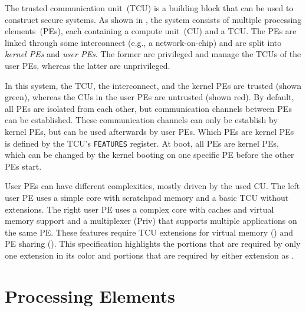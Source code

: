 \noindent The trusted communication unit~(TCU) is a building block that can be used to construct
secure systems. As shown in , the system consists of multiple processing
elements~(PEs), each containing a compute unit~(CU) and a TCU. The PEs are linked through some
interconnect (e.g., a network-on-chip) and are split into \emph{kernel PEs} and \emph{user PEs}. The
former are privileged and manage the TCUs of the user PEs, whereas the latter are unprivileged.

In this system, the TCU, the interconnect, and the kernel PEs are trusted (shown green), whereas the
CUs in the user PEs are untrusted (shown red). By default, all PEs are isolated from each other, but
communication channels between PEs can be established. These communication channels can only be
establish by kernel PEs, but can be used afterwards by user PEs. Which PEs are kernel PEs is defined
by the TCU's \texttt{FEATURES} register. At boot, all PEs are kernel PEs, which can be changed by
the kernel booting on one specific PE before the other PEs start.

User PEs can have different complexities, mostly driven by the used CU. The left user PE uses a
simple core with scratchpad memory and a basic TCU without extensions. The right user PE uses a
complex core with caches and virtual memory support and a multiplexer (Priv) that supports multiple
applications on the same PE. These features require TCU extensions for virtual memory ()
and PE sharing (). This specification highlights the portions that are required by
only one extension in its color and portions that are required by either extension as
.

\section{Processing Elements}

